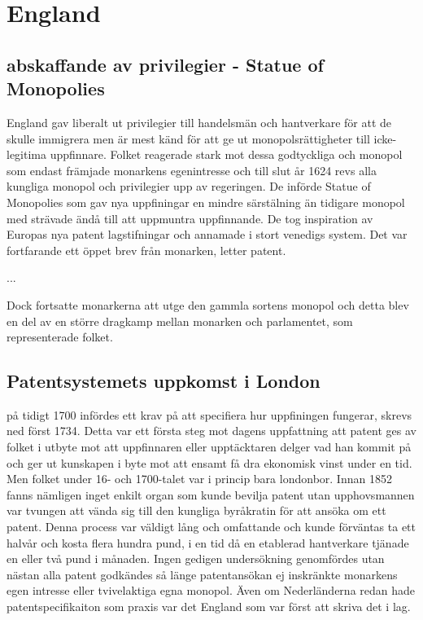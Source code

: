 \section{England} %
\label{sec:england}

\subsection{abskaffande av privilegier - Statue of Monopolies} %
\label{sub:abskaffande_av_privilegier_statue_of_monopolies}

England gav liberalt ut privilegier till handelsmän och hantverkare för att de skulle immigrera men är mest känd för att ge ut monopolsrättigheter till icke-legitima uppfinnare. Folket reagerade stark mot dessa godtyckliga och monopol som endast främjade monarkens egenintresse och till slut år 1624 revs alla kungliga monopol och privilegier upp av regeringen. De införde Statue of Monopolies som gav nya uppfiningar en mindre särstälning än tidigare monopol med strävade ändå till att uppmuntra uppfinnande. De tog inspiration av Europas nya patent lagstifningar och annamade i stort venedigs system. Det var fortfarande ett öppet brev från monarken, letter patent.

...


Dock fortsatte monarkerna att utge den gammla sortens monopol och detta blev en del av en större dragkamp mellan monarken och parlamentet, som representerade folket. 


\subsection{Patentsystemets uppkomst i London} %
\label{sub:patentsystemets_uppkomst_i_london}


på tidigt 1700 infördes ett krav på att specifiera hur uppfiningen fungerar, skrevs ned först 1734. Detta var ett första steg mot dagens uppfattning att patent ges av folket i utbyte mot att uppfinnaren eller upptäcktaren delger vad han kommit på och ger ut kunskapen i byte mot att ensamt få dra ekonomisk vinst under en tid. Men folket under 16- och 1700-talet var i princip bara londonbor. Innan 1852 fanns nämligen inget enkilt organ som kunde bevilja patent utan upphovsmannen var tvungen att vända sig till den kungliga byråkratin för att ansöka om ett patent. Denna process var väldigt lång och omfattande och kunde förväntas ta ett halvår och kosta flera hundra pund, i en tid då en etablerad hantverkare tjänade en eller två pund i månaden. Ingen gedigen undersökning genomfördes utan nästan alla patent godkändes så länge patentansökan ej inskränkte monarkens egen intresse eller tvivelaktiga egna monopol. Även om Nederländerna redan hade patentspecifikaiton som praxis var det England som var först att skriva det i lag. 


